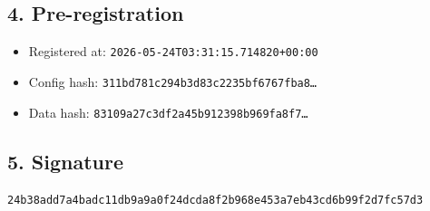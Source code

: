 \documentclass{article}
\begin{document}
\subsection*{4. Pre-registration}
\begin{itemize}
\item Registered at: \texttt{2026-05-24T03:31:15.714820+00:00}
\item Config hash: \texttt{311bd781c294b3d83c2235bf6767fba8\dots}
\item Data hash: \texttt{83109a27c3df2a45b912398b969fa8f7\dots}
\end{itemize}
\subsection*{5. Signature}
\texttt{24b38add7a4badc11db9a9a0f24dcda8f2b968e453a7eb43cd6b99f2d7fc57d3}\\
\end{document}
